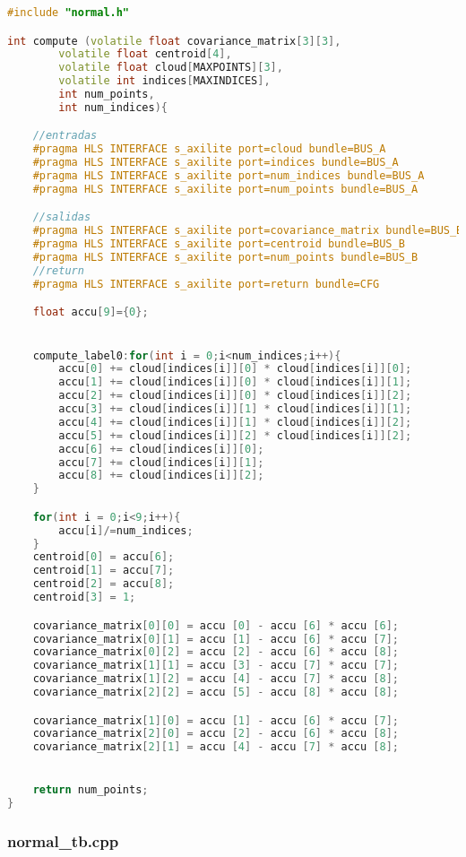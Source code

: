 \begin{lstlisting}[language=C++,breaklines]
 #include "normal.h"

int compute (volatile float covariance_matrix[3][3],
		volatile float centroid[4],
		volatile float cloud[MAXPOINTS][3],
		volatile int indices[MAXINDICES],
		int num_points,
		int num_indices){

	//entradas
	#pragma HLS INTERFACE s_axilite port=cloud bundle=BUS_A
	#pragma HLS INTERFACE s_axilite port=indices bundle=BUS_A
	#pragma HLS INTERFACE s_axilite port=num_indices bundle=BUS_A
	#pragma HLS INTERFACE s_axilite port=num_points bundle=BUS_A

	//salidas
	#pragma HLS INTERFACE s_axilite port=covariance_matrix bundle=BUS_B
	#pragma HLS INTERFACE s_axilite port=centroid bundle=BUS_B
	#pragma HLS INTERFACE s_axilite port=num_points bundle=BUS_B
	//return
	#pragma HLS INTERFACE s_axilite port=return bundle=CFG

	float accu[9]={0};


	compute_label0:for(int i = 0;i<num_indices;i++){
		accu[0] += cloud[indices[i]][0] * cloud[indices[i]][0];
		accu[1] += cloud[indices[i]][0] * cloud[indices[i]][1];
		accu[2] += cloud[indices[i]][0] * cloud[indices[i]][2];
		accu[3] += cloud[indices[i]][1] * cloud[indices[i]][1];
		accu[4] += cloud[indices[i]][1] * cloud[indices[i]][2];
		accu[5] += cloud[indices[i]][2] * cloud[indices[i]][2];
		accu[6] += cloud[indices[i]][0];
		accu[7] += cloud[indices[i]][1];
		accu[8] += cloud[indices[i]][2];
	}

	for(int i = 0;i<9;i++){
		accu[i]/=num_indices;
	}
	centroid[0] = accu[6];
	centroid[1] = accu[7];
	centroid[2] = accu[8];
	centroid[3] = 1;

	covariance_matrix[0][0] = accu [0] - accu [6] * accu [6];
	covariance_matrix[0][1] = accu [1] - accu [6] * accu [7];
	covariance_matrix[0][2] = accu [2] - accu [6] * accu [8];
	covariance_matrix[1][1] = accu [3] - accu [7] * accu [7];
	covariance_matrix[1][2] = accu [4] - accu [7] * accu [8];
	covariance_matrix[2][2] = accu [5] - accu [8] * accu [8];

	covariance_matrix[1][0] = accu [1] - accu [6] * accu [7];
	covariance_matrix[2][0] = accu [2] - accu [6] * accu [8];
	covariance_matrix[2][1] = accu [4] - accu [7] * accu [8];


	return num_points;
}
\end{lstlisting}

\subsubsection{normal\_tb.cpp}

